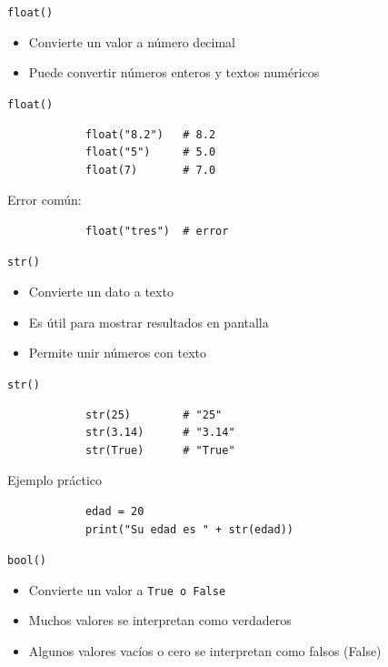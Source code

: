 \documentclass{beamer}
\begin{document}
    \begin{frame}{\texttt{float()}}
        \begin{itemize}
            \item Convierte un valor a número decimal
            \item Puede convertir números enteros y textos numéricos
        \end{itemize}
    \end{frame}

    \begin{frame}[fragile,t]{\texttt{float()}}
        \begin{verbatim}
            float("8.2")   # 8.2
            float("5")     # 5.0
            float(7)       # 7.0
        \end{verbatim}
        Error común:
        \begin{verbatim}
            float("tres")  # error
        \end{verbatim}
    \end{frame}

    \begin{frame}{\texttt{str()}}
        \begin{itemize}
            \item Convierte un dato a texto
            \item Es útil para mostrar resultados en pantalla
            \item Permite unir números con texto
        \end{itemize}
    \end{frame}

    \begin{frame}[fragile,t]{\texttt{str()}}
        \begin{verbatim}
            str(25)        # "25"
            str(3.14)      # "3.14"
            str(True)      # "True"
        \end{verbatim}
        Ejemplo práctico
        \begin{verbatim}
            edad = 20
            print("Su edad es " + str(edad))
        \end{verbatim}
    \end{frame}

    \begin{frame}[fragile,t]{\texttt{bool()}}
        \begin{itemize}
            \item Convierte un valor a \texttt{True o False}
            \item Muchos valores se interpretan como verdaderos
            \item Algunos valores vacíos o cero se interpretan como falsos (False)
        \end{itemize}
    \end{frame}
\end{document}
